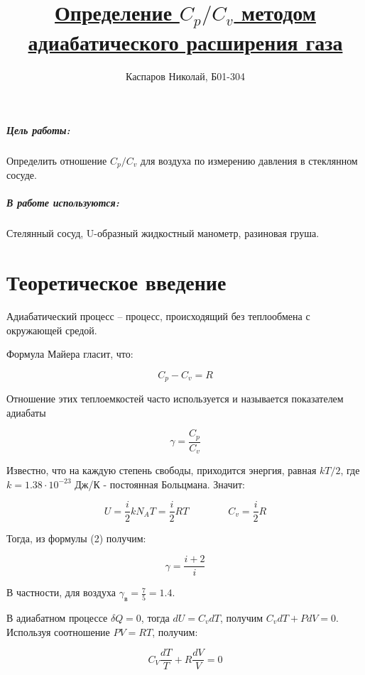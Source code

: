 \documentclass[a4paper]{article}
\title{\underline{Определение $C_p / C_v$ методом адиабатического расширения газа}}
\author{Каспаров Николай, Б01-304}
\begin{document}
\maketitle
\begin{center}
\Large{\textbf{ }}
\end{center}

\subparagraph{Цель работы:}

Определить отношение $C_p / C_v$ для воздуха по измерению давления в стеклянном сосуде.

\subparagraph{В работе используются:}

Стелянный сосуд, U-образный жидкостный манометр, разиновая груша.

\section{Теоретическое введение}

Адиабатический процесс -- процесс, происходящий без теплообмена с окружающей средой.

Формула Майера гласит, что:

\begin{equation}
    C_p - C_v = R 
\end{equation}

Отношение этих теплоемкостей часто используется и называется показателем адиабаты

\begin{equation}
     \gamma = \frac{C_p}{C_v}
\end{equation}

Известно, что на каждую степень свободы, приходится энергия, равная $kT/2$, 
где $k = 1.38 \cdot 10^{-23} $ Дж/К - постоянная Больцмана. Значит:

\begin{equation}
    U = \frac{i}{2}kN_AT = \frac{i}{2}RT \qquad \qquad
    C_v = \frac{i}{2}R
\end{equation}

Тогда, из формулы (2) получим:

\begin{equation}
     \gamma = \frac{i + 2}{i}
\end{equation}

В частности, для воздуха $\gamma_\text{в} = \frac{7}{5} = 1.4$.

В адиабатном процессе $\delta Q = 0$, тогда $dU = C_vdT$, получим $C_vdT + PdV = 0$.
Используя соотношение $PV = RT$, получим:

\begin{equation*}
    C_V \frac{dT}{T} + R \frac{dV}{V} = 0
\end{equation*}
\end{document}
